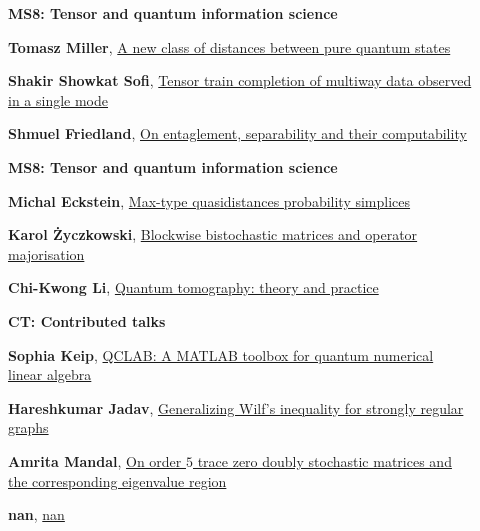 \documentclass[ILAS2025-program.tex]{subfiles}
\begin{document}
        \begin{description}
    \item[] {\color{mstitle}\textbf{MS8: Tensor and quantum information science}} 
    \item[] \hypertarget{up0019}{}\textbf{Tomasz Miller}, \hyperlink{down0019}{A new class of distances between pure quantum states}
        \item[] \hypertarget{up0020}{}\textbf{Shakir Showkat Sofi}, \hyperlink{down0020}{Tensor train completion of multiway data observed in a single mode}
        \item[] \hypertarget{up0021}{}\textbf{Shmuel Friedland}, \hyperlink{down0021}{On entaglement, separability and their computability}
        \end{description}
    \begin{description}
    \item[] {\color{mstitle}\textbf{MS8: Tensor and quantum information science}} 
    \item[] \hypertarget{up0052}{}\textbf{Michal Eckstein}, \hyperlink{down0052}{Max-type quasidistances probability simplices}
        \item[] \hypertarget{up0053}{}\textbf{Karol Życzkowski}, \hyperlink{down0053}{Blockwise bistochastic matrices and operator majorisation}
        \item[] \hypertarget{up0054}{}\textbf{Chi-Kwong Li}, \hyperlink{down0054}{Quantum tomography: theory and practice
}
        \end{description}
    \begin{description}
    \item[] {\color{mstitle}\textbf{CT: Contributed talks}} 
    \item[] \hypertarget{up0088}{}\textbf{Sophia Keip}, \hyperlink{down0088}{QCLAB: A MATLAB toolbox for quantum numerical linear algebra}
        \item[] \hypertarget{up0089}{}\textbf{Hareshkumar Jadav}, \hyperlink{down0089}{Generalizing Wilf's inequality for strongly regular graphs}
        \item[] \hypertarget{up0090}{}\textbf{Amrita Mandal}, \hyperlink{down0090}{On order $5$ trace zero doubly stochastic matrices and the corresponding eigenvalue region}
        \item[] \hypertarget{up0091}{}\textbf{nan}, \hyperlink{down0091}{nan}
        \end{description}
    \newpage
\end{document}
